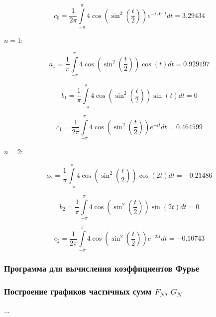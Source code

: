 \documentclass[a5paper, 10pt]{article}
\theoremstyle{definition}
\theoremstyle{plain}
\theoremstyle{remark}
\begin{document}
\begin{equation}
c_0 = \frac{1}{2 \pi} \int \limits_{-\pi}^{\pi} 4 \cos \left( \sin^2 \left( \frac{t}{2}\right) \right) e^{-i \cdot 0 \cdot t} dt = 3.29434
\end{equation}

$n = 1:$

\begin{equation}
a_1  =  \frac{1}{\pi}\int \limits_{-\pi}^{\pi} 4 \cos \left( \sin^2 \left( \frac{t}{2}\right) \right) \cos (t) dt = 0.929197
\end{equation}

\begin{equation}
b_1 =  \frac{1}{\pi}\int \limits_{-\pi}^{\pi} 4 \cos \left( \sin^2 \left( \frac{t}{2}\right) \right) \sin (t) dt  = 0
\end{equation}

\begin{equation}
c_1 = \frac{1}{2 \pi} \int \limits_{-\pi}^{\pi} 4 \cos \left( \sin^2 \left( \frac{t}{2}\right) \right) e^{-i t} dt = 0.464599
\end{equation}

$n = 2:$

\begin{equation}
a_2 =  \frac{1}{\pi}\int \limits_{-\pi}^{\pi} 4 \cos \left( \sin^2 \left( \frac{t}{2}\right) \right) \cos (2t) dt = -0.21486
\end{equation}

\begin{equation}
b_2 =  \frac{1}{\pi}\int \limits_{-\pi}^{\pi} 4 \cos \left( \sin^2 \left( \frac{t}{2}\right) \right) \sin (2t) dt = 0
\end{equation}

\begin{equation}
c_2 = \frac{1}{2 \pi} \int \limits_{-\pi}^{\pi} 4 \cos \left( \sin^2 \left( \frac{t}{2}\right) \right) e^{-2i t} dt = -0.10743
\end{equation}


\subsubsection{Программа для вычисления коэффициентов Фурье}


\subsubsection{Построение графиков частичных сумм $F_N$, $G_N$}

...
\end{document}
